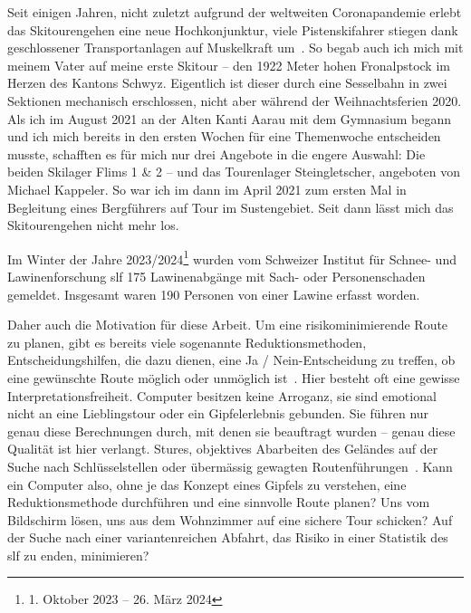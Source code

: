 


Seit einigen Jahren, nicht zuletzt aufgrund der weltweiten Coronapandemie erlebt das Skitourengehen eine neue Hochkonjunktur, viele Pistenskifahrer stiegen dank geschlossener Transportanlagen auf Muskelkraft um~\cite{sacCoronaTrend}. So begab auch ich mich mit meinem Vater auf meine erste Skitour – den 1922 Meter hohen Fronalpstock im Herzen des Kantons Schwyz. Eigentlich ist dieser durch eine Sesselbahn in zwei Sektionen mechanisch erschlossen, nicht aber während der Weihnachtsferien 2020.
Als ich im August 2021 an der Alten Kanti Aarau mit dem Gymnasium begann und ich mich bereits in den ersten Wochen für eine Themenwoche entscheiden musste, schafften es für mich nur drei Angebote in die engere Auswahl: Die beiden Skilager Flims 1 \& 2 – und das Tourenlager Steingletscher, angeboten von Michael Kappeler. So war ich im dann im April 2021 zum ersten Mal in Begleitung eines Bergführers auf Tour im Sustengebiet. Seit dann lässt mich das Skitourengehen nicht mehr los.

Im Winter der Jahre 2023/2024\footnote{1. Oktober 2023 -- 26. März 2024} wurden vom Schweizer Institut für Schnee- und Lawinenforschung \gls{slf} 175 Lawinenabgänge mit Sach- oder Personenschaden gemeldet. Insgesamt waren 190 Personen von einer Lawine erfasst worden.~\cite{slfWinterbericht202324}

Daher auch die Motivation für diese Arbeit. Um eine risikominimierende Route zu planen, gibt es bereits viele sogenannte Reduktionsmethoden, Entscheidungshilfen, die dazu dienen, eine Ja / Nein-Entscheidung zu treffen, ob eine gewünschte Route möglich oder unmöglich ist~\cite{skitourenguruReduktionsmethoden}\cite{harveyrhynerschweizerlawinenkunde}.
Hier besteht oft eine gewisse Interpretationsfreiheit. Computer besitzen keine Arroganz, sie sind emotional nicht an eine Lieblingstour oder ein Gipfelerlebnis gebunden. Sie führen nur genau diese Berechnungen durch, mit denen sie beauftragt wurden – genau diese Qualität ist hier verlangt. Stures, objektives Abarbeiten des Geländes auf der Suche nach Schlüsselstellen oder übermässig gewagten Routenführungen~\cite{harveyrhynerschweizerlawinenkunde}. Kann ein Computer also, ohne je das Konzept eines Gipfels zu verstehen, eine Reduktionsmethode durchführen und eine sinnvolle Route planen? Uns vom Bildschirm lösen, uns aus dem Wohnzimmer auf eine sichere Tour schicken? 
Auf der Suche nach einer variantenreichen Abfahrt, das Risiko in einer Statistik des \gls{slf} zu enden, minimieren?



